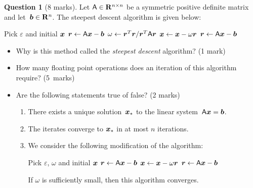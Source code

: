 \documentclass[11pt]{article}
\theoremstyle{definition}
\newtheorem{question}{Question}
\begin{document}
\newpage
\begin{question}
    [8 marks]
    Let $\mathsf A \in \mathbf R^{n \times n}$ be a symmetric positive definite matrix and let~$\mathbf{\boldsymbol{b}} \in \mathbf R^{n}$.
    The steepest descent algorithm is given below:

    \begin{center}
    \begin{algorithmic}
    \State Pick $\varepsilon$ and initial $\mathbf{\boldsymbol{x}}$%
    \State $\mathbf{\boldsymbol{r}} \gets \mathsf A \mathbf{\boldsymbol{x}} - \mathbf{\boldsymbol{b}}$%
        \State $\omega \gets \mathbf{\boldsymbol{r}}^T \mathbf{\boldsymbol{r}}/\mathbf{\boldsymbol{r}}^T \mathsf A \mathbf{\boldsymbol{r}}$
        \State $\mathbf{\boldsymbol{x}} \gets \mathbf{\boldsymbol{x}} - \omega \mathbf{\boldsymbol{r}}$
        \State $\mathbf{\boldsymbol{r}} \gets \mathsf A \mathbf{\boldsymbol{x}} - \mathbf{\boldsymbol{b}}$
    \EndWhile
    \end{algorithmic}
    \end{center}

    \noindent
    \begin{itemize}
        \item
            Why is this method called the \emph{steepest descent} algorithm? (1 mark)

        \item
            How many floating point operations does an iteration of this algorithm require? (5~marks)

        \item Are the following statements true of false? (2 marks)
        \begin{enumerate}
            \item
                There exists a unique solution~$\mathbf{\boldsymbol{x}}_*$ to the linear system~\( \mathsf A \mathbf{\boldsymbol{x}} = \mathbf{\boldsymbol{b}} \).

            \item
                The iterates converge to $\mathbf{\boldsymbol{x}}_*$ in at most $n$ iterations.

            \item
                We consider the following modification of the algorithm:
                \begin{center}
                \begin{algorithmic}
                \State Pick $\varepsilon$, $\omega$ and initial $\mathbf{\boldsymbol{x}}$%
                \State $\mathbf{\boldsymbol{r}} \gets \mathsf A \mathbf{\boldsymbol{x}} - \mathbf{\boldsymbol{b}}$%
                    \State $\mathbf{\boldsymbol{x}} \gets \mathbf{\boldsymbol{x}} - \omega \mathbf{\boldsymbol{r}}$
                    \State $\mathbf{\boldsymbol{r}} \gets \mathsf A \mathbf{\boldsymbol{x}} - \mathbf{\boldsymbol{b}}$
                \EndWhile
                \end{algorithmic}
                \end{center}
                If $\omega$ is sufficiently small, then this algorithm converges.


\end{enumerate}
\end{itemize}
\end{question}
\end{document}
